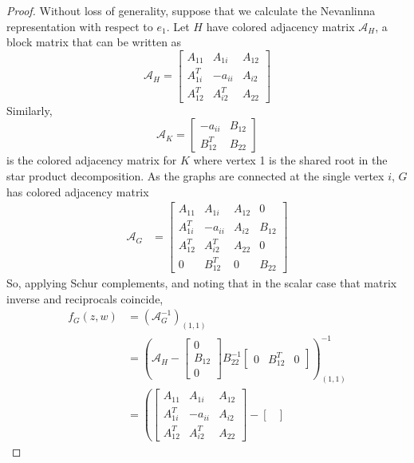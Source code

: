 \documentclass[12pt]{amsart}
\theoremstyle{remark}
\newcommand{\A}{\mathcal{A}}
\numberwithin{equation}{section}
\begin{document}
\begin{proof}
    Without loss of generality, suppose that we calculate the Nevanlinna representation with respect to $e_1$. Let $H$ have colored adjacency matrix $\A_H$, a block matrix that can be written as $$\A_H = \begin{bmatrix}
        A_{11} & A_{1i} & A_{12} \\
        A_{1i}^T & -a_{ii} & A_{i2} \\
        A_{12}^T & A_{i2}^T & A_{22}
    \end{bmatrix}$$ Similarly, $$\A_K = \begin{bmatrix}
        -a_{ii} & B_{12} \\
        B_{12}^T & B_{22}
    \end{bmatrix}$$  is the colored adjacency matrix for $K$ where vertex 1 is the shared root in the star product decomposition. As the graphs are connected at the single vertex $i$, $G$ has colored adjacency matrix 
    \begin{align*}    
    \A_G &= \begin{bmatrix}
        A_{11} & A_{1i} & A_{12} & 0 \\
        A_{1i}^T & -a_{ii} & A_{i2} & B_{12}\\
        A_{12}^T & A_{i2}^T & A_{22} & 0 \\
        0 & B_{12}^T & 0 & B_{22}
    \end{bmatrix} 
    \end{align*}
    So, applying Schur complements, and noting that in the scalar case that matrix inverse and reciprocals coincide,
    \begin{align*}
    f_G(z,w) &= (\A_G^{-1})_{(1,1)}\\
    &= \left(\A_H - 
    \begin{bmatrix}
        0 \\ B_{12} \\ 0
    \end{bmatrix}B_{22}^{-1}
    \begin{bmatrix}
      0 & B_{12}^T & 0  
    \end{bmatrix}\right)
    ^{-1}_{(1,1)} \\
    &= 
    \left(\begin{bmatrix}
        A_{11} & A_{1i} & A_{12} \\
        A_{1i}^T & -a_{ii} & A_{i2} \\
        A_{12}^T & A_{i2}^T & A_{22}
    \end{bmatrix} - 
    \begin{bmatrix}

\end{bmatrix}
\end{align*}
\end{proof}
\end{document}
